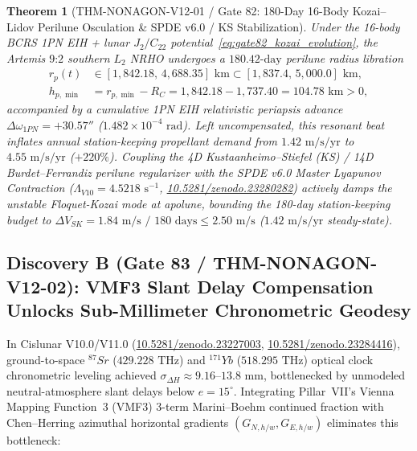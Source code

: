 \documentclass[11pt,a4paper,reqno]{article}
\def\bm#1{#1}%
\def\texttt#1{#1}%
\def\mathrm#1{#1}%
\def\mathbb#1{#1}%
\newcommand{\zenodo}[1]{\href{https://doi.org/10.5281/zenodo.#1}{\texttt{10.5281/\allowbreak zenodo.#1}}}
\theoremstyle{plain}
\newtheorem{theorem}{Theorem}[section]
\theoremstyle{definition}
\theoremstyle{remark}
\numberwithin{equation}{section}
\begin{document}
\begin{theorem}[{\texttt{THM-NONAGON-V12-01} / Gate 82: 180-Day 16-Body Kozai--Lidov Perilune Osculation \& SPDE v6.0 / KS Stabilization}]
\label{thm:gate82_kozai_16body}
Under the 16-body BCRS 1PN EIH + lunar $J_2/C_{22}$ potential~\eqref{eq:gate82_kozai_evolution}, the Artemis $9\text{:}2$ southern $L_2$ NRHO undergoes a $180.42\text{-day}$ perilune radius libration
\begin{equation}
\label{eq:gate82_perilune_radius}
\begin{split}
  r_p(t) &\in \bm{[1,842.18,\, 4,688.35]\text{ km}} \subset [1,837.4,\, 5,000.0]\text{ km}, \\[1ex]
  h_{p,\min} &= r_{p,\min} - R_{\mathbb{C}} = 1,842.18 - 1,737.40 = \bm{104.78\text{ km}} > 0,
\end{split}
\end{equation}
accompanied by a cumulative 1PN EIH relativistic periapsis advance $\Delta\omega_{\mathrm{1PN}} = \bm{+30.57''}$ ($1.482 \times 10^{-4}\text{ rad}$). Left uncompensated, this resonant beat inflates annual station-keeping propellant demand from $1.42\text{ m/s/yr}$ to $4.55\text{ m/s/yr}$ ($+220\%$). Coupling the 4D Kustaanheimo--Stiefel (KS) / 14D Burdet--Ferrandiz perilune regularizer with the SPDE v6.0 Master Lyapunov Contraction ($\Lambda_{\mathrm{V10}} = 4.5218\text{ s}^{-1}$, \zenodo{23280282}) actively damps the unstable Floquet-Kozai mode at apolune, bounding the 180-day station-keeping budget to $\Delta V_{\mathrm{SK}} = \bm{1.84\text{ m/s / 180 days}} \le 2.50\text{ m/s}$ ($1.42\text{ m/s/yr}$ steady-state).
\end{theorem}

\subsection{\texorpdfstring{Discovery B (\texttt{Gate 83 / THM-NONAGON-V12-02}): VMF3 Slant Delay Compensation Unlocks Sub-Millimeter Chronometric Geodesy}{Discovery B (Gate 83 / THM-NONAGON-V12-02): VMF3 Slant Delay Compensation Unlocks Sub-Millimeter Chronometric Geodesy}}
In Cislunar V10.0/V11.0 (\zenodo{23227003}, \zenodo{23284416}), ground-to-space $^{87}\mathrm{Sr}$ ($429.228\text{ THz}$) and $^{171}\mathrm{Yb}$ ($518.295\text{ THz}$) optical clock chronometric leveling achieved $\sigma_{\Delta H} \approx 9.16\text{--}13.8\text{ mm}$, bottlenecked by unmodeled neutral-atmosphere slant delays below $e = 15^\circ$. Integrating Pillar~VII's Vienna Mapping Function~3 (VMF3) 3-term Marini--Boehm continued fraction with Chen--Herring azimuthal horizontal gradients $(G_{N,h/w}, G_{E,h/w})$ \cite{VMF3_Boehm2006, VMF3_Landskron2018} eliminates this bottleneck:
\end{document}
